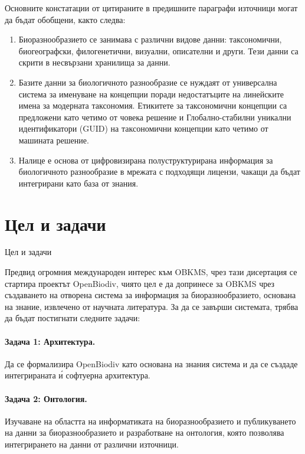 Основните констатации от цитираните в предишните параграфи източници могат да бъдат обобщени, както следва:

\begin{enumerate}

\item{Биоразнообразието се занимава с различни видове данни: таксономични, биогеографски, филогенетични, визуални, описателни и други. Тези данни са скрити в несвързани хранилища за данни.}

\item{Базите данни за биологичното разнообразие се нуждаят от универсална система за именуване на концепции поради недостатъците на линейските имена за модерната таксономия. Етикитете за таксономични концепции са предложени като четимо от човека решение и Глобално-стабилни уникални идентификатори (GUID) на таксономични концепции като четимо от машината решение.}

\item{Налице е основа от цифровизирана полуструктурирана информация за биологичното разнообразие в мрежата с подходящи лицензи, чакащи да бъдат интегрирани като база от знания.}

\end{enumerate}


\section*{Цел и задачи}
 {Цел и задачи}

Предвид огромния международен интерес към OBKMS, чрез тази дисертация се стартира проектът OpenBiodiv, чиято цел е да допринесе за OBKMS чрез създаването на отворена система за информация за биоразнообразието, основана на знание,  извлечено от научната литература. За да се завърши системата, трябва да бъдат постигнати следните задачи:

\paragraph{Задача 1: Архитектура.} Да се формализира OpenBiodiv като основана на знания система и да се създаде интегрираната \'{и} софтуерна архитектура.

\paragraph{Задача 2: Онтология.} Изучаване на областта на информатиката на биоразнообразието и публикуването на данни за биоразнообразието и разработване на онтология, която позволява интегрирането на данни от различни източници.


